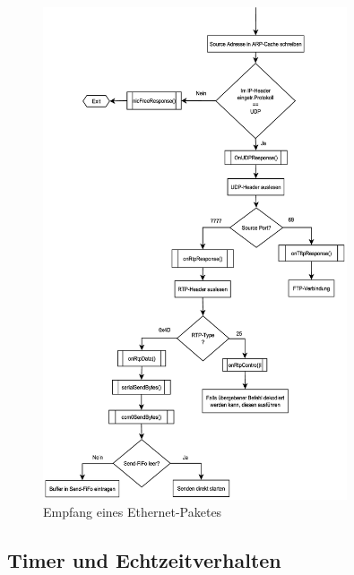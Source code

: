 \documentclass[a4paper]{book}%
\begin{document}
\begin{figure}[H]
	\centering
	\includegraphics[width=0.8\textwidth]{figures/ethernetto232-dia-02.eps}
	\caption[Empfang eines Ethernet-Paketes]{Empfang eines Ethernet-Paketes}
	\label{fig:ethernettors232 part2}
\end{figure}




\subsection{Timer und Echtzeitverhalten}
\end{document}
